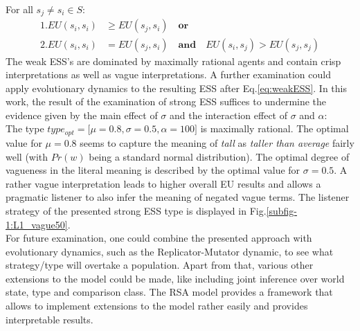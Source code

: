 For all $s_j \neq s_i \in  S$:
\begin{align}
\label{eq:weakESS}
1. EU(s_i, s_i) &\geq EU(s_j, s_i) \quad \textbf{or} \\
2. EU(s_i, s_i) &= EU(s_j, s_i) \quad \textbf{and} \quad EU(s_i, s_j) > EU(s_j, s_j)
\end{align}
The weak ESS's are dominated by maximally rational agents and contain crisp interpretations as well as vague interpretations. A further examination could apply evolutionary dynamics to the resulting ESS after Eq.\ref{eq:weakESS}. In this work, the result of the examination of strong ESS suffices to undermine the evidence given by the main effect of $\sigma$ and the interaction effect of $\sigma$ and $\alpha$:\\

The type $type_{opt} = \big[ \mu=0.8, \sigma=0.5, \alpha=100 \big] $ is maximally rational. The optimal value for $\mu = 0.8$ seems to capture the meaning of \textit{tall} as \textit{taller than average} fairly well (with $Pr(w)$ being a standard normal distribution). The optimal degree of vagueness in the literal meaning is described by the optimal value for $\sigma = 0.5$. A rather vague interpretation leads to higher overall EU results and allows a pragmatic listener to also infer the meaning of negated vague terms. The listener strategy of the presented strong ESS type is displayed in Fig.\ref{subfig-1:L1_vague50}.\\

For future examination, one could combine the presented approach with evolutionary dynamics, such as the Replicator-Mutator dynamic, to see what strategy/type will overtake a population. Apart from that, various other extensions to the model could be made, like including joint inference over world state, type and comparison class. The RSA model provides a framework that allows to implement extensions to the model rather easily and provides interpretable results.